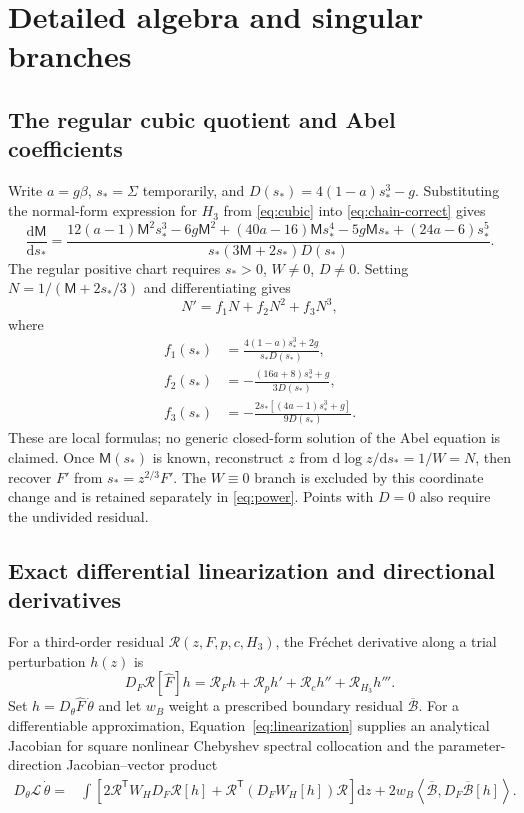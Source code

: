\documentclass[11pt,a4paper,oneside]{report}
\numberwithin{equation}{chapter}
\newcommand{\R}{\mathcal R}
\newcommand{\dd}{\mathrm d}
\begin{document}
\label{end:main}\clearpage\appendix
\chapter{Detailed algebra and singular branches}\label{app:algebra}
\section{The regular cubic quotient and Abel coefficients}
Write $a=g\beta$, $s_*=\Sigma$ temporarily, and
$D(s_*)=4(1-a)s_*^3-g$. Substituting the normal-form expression for $H_3$ from \eqref{eq:cubic} into \eqref{eq:chain-correct} gives
\begin{equation}\label{eq:quotient-explicit}
\frac{\dd\mathsf M}{\dd s_*}=
\frac{12(a-1)\mathsf M^2s_*^3-6g\mathsf M^2
 +(40a-16)\mathsf M s_*^4-5g\mathsf M s_*
 +(24a-6)s_*^5}{s_*(3\mathsf M+2s_*)D(s_*)}.
\end{equation}
The regular positive chart requires $s_*>0$, $W\ne0$, $D\ne0$. Setting $N=1/(\mathsf M+2s_*/3)$ and differentiating gives
\begin{equation}
N'=f_1N+f_2N^2+f_3N^3,
\end{equation}
where
\begin{align}
f_1(s_*)&=\frac{4(1-a)s_*^3+2g}{s_*D(s_*)},\\
f_2(s_*)&=-\frac{(16a+8)s_*^3+g}{3D(s_*)},\\
f_3(s_*)&=-\frac{2s_*[(4a-1)s_*^3+g]}{9D(s_*)}.
\end{align}
These are local formulas; no generic closed-form solution of the Abel equation is claimed. Once $\mathsf M(s_*)$ is known, reconstruct $z$ from
$\dd\log z/\dd s_*=1/W=N$, then recover $F'$ from $s_*=z^{2/3}F'$. The $W\equiv0$ branch is excluded by this coordinate change and is retained separately in \eqref{eq:power}. Points with $D=0$ also require the undivided residual.

\section{Exact differential linearization and directional derivatives}
For a third-order residual $\R(z,F,p,c,H_3)$, the Fr\'echet derivative along a trial perturbation $h(z)$ is
\begin{equation}\label{eq:linearization}
D_F\R[\widehat F]h=\R_Fh+\R_ph'+\R_ch''+\R_{H_3}h'''.
\end{equation}
Set $h=D_\theta\widehat F\,\dot\theta$ and let $w_B$ weight a prescribed boundary residual $\overline{\mathcal B}$. For a differentiable approximation, Equation~\eqref{eq:linearization} supplies an analytical Jacobian for square nonlinear Chebyshev spectral collocation and the parameter-direction Jacobian--vector product
\begin{align}\label{eq:directionalloss}
D_\theta\mathcal L\,\dot\theta
={}&\int\left[2\R^{\mathsf T}W_H D_F\R[h]
 +\R^{\mathsf T}(D_FW_H[h])\R\right]\dd z
 +2w_B\left\langle\overline{\mathcal B},
 D_F\overline{\mathcal B}[h]\right\rangle.
\end{align}
\end{document}
